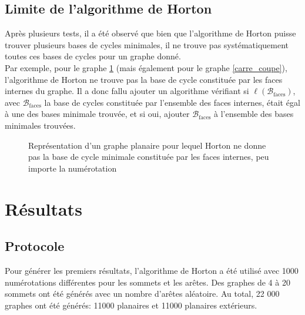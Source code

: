 \documentclass{article}
\begin{document}
\subsection{Limite de l'algorithme de Horton}
Après plusieurs tests, il a été observé que bien que l'algorithme de Horton puisse trouver plusieurs bases de cycles minimales, il ne trouve pas systématiquement toutes ces bases de cycles pour un graphe donné.\\
Par exemple, pour le graphe \ref{horton-pas-face} (mais également pour le graphe \ref{carre_coupe}), l'algorithme de Horton ne trouve pas la base de cycle constituée par les faces internes du graphe. Il a donc fallu ajouter un algorithme vérifiant si $\ell(\mathcal{B}_{\text{faces}})$, avec $\mathcal{B}_{\text{faces}}$ la base de cycles constituée par l'ensemble des faces internes, était égal à une des bases minimale trouvée, et si oui, ajouter $\mathcal{B}_{\text{faces}}$ à l'ensemble des bases minimales trouvées.

\begin{figure}[h]
    \centering

    \caption{Représentation d'un graphe planaire pour lequel Horton ne donne pas la base de cycle minimale constituée par les faces internes, peu importe la numérotation}
    \label{horton-pas-face}
\end{figure}

\section{Résultats}

\subsection{Protocole}

Pour générer les premiers résultats, l'algorithme de Horton a été utilisé avec 1000 numérotations différentes pour les sommets et les arêtes. Des graphes de 4 à 20 sommets ont été générés avec un nombre d'arêtes aléatoire. Au total, 22 000 graphes ont été générés: 11000 planaires et 11000 planaires extérieurs.
\end{document}

